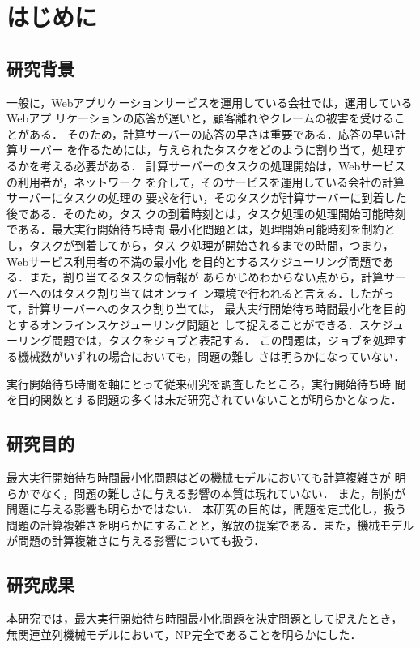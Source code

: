 \documentclass[12pt]{optlab-bachelor}
\begin{document}
\frontmatter

\chapter{はじめに}\label{c_1}
\section{研究背景}
一般に，Webアプリケーションサービスを運用している会社では，運用しているWebアプ
リケーションの応答が遅いと，顧客離れやクレームの被害を受けることがある．
そのため，計算サーバーの応答の早さは重要である．応答の早い計算サーバー
を作るためには，与えられたタスクをどのように割り当て，処理するかを考える必要がある．
計算サーバーのタスクの処理開始は，Webサービスの利用者が，ネットワーク
を介して，そのサービスを運用している会社の計算サーバーにタスクの処理の
要求を行い，そのタスクが計算サーバーに到着した後である．そのため，タス
クの到着時刻とは，タスク処理の処理開始可能時刻である．最大実行開始待ち時間
最小化問題とは，処理開始可能時刻を制約とし，タスクが到着してから，タス
ク処理が開始されるまでの時間，つまり，Webサービス利用者の不満の最小化
を目的とするスケジューリング問題である．また，割り当てるタスクの情報が
あらかじめわからない点から，計算サーバーへのはタスク割り当てはオンライ
ン環境で行われると言える．したがって，計算サーバーへのタスク割り当ては，
最大実行開始待ち時間最小化を目的とするオンラインスケジューリング問題と
して捉えることができる．スケジューリング問題では，タスクをジョブと表記する．
この問題は，ジョブを処理する機械数がいずれの場合においても，問題の難し
さは明らかになっていない．

実行開始待ち時間を軸にとって従来研究を調査したところ，実行開始待ち時
間を目的関数とする問題の多くは未だ研究されていないことが明らかとなった．

\section{研究目的}
最大実行開始待ち時間最小化問題はどの機械モデルにおいても計算複雑さが
明らかでなく，問題の難しさに与える影響の本質は現れていない．
また，制約が問題に与える影響も明らかではない．
本研究の目的は，問題を定式化し，扱う問題の計算複雑さを明らかにすることと，解放の提案である．また，機械モデルが問題の計算複雑さに与える影響についても扱う．

\section{研究成果}
本研究では，最大実行開始待ち時間最小化問題を決定問題として捉えたとき，
無関連並列機械モデルにおいて，NP完全であることを明らかにした．
\end{document}
